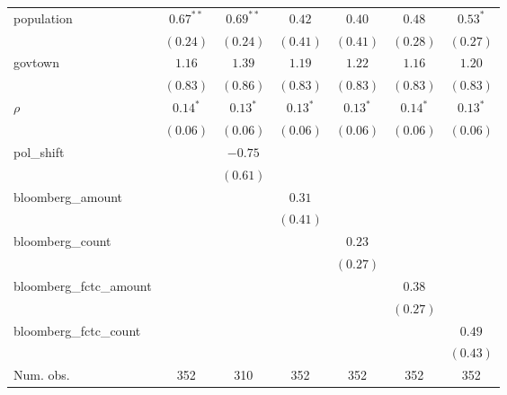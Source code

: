 \begin{table}[!h]
\begin{center}
\begin{tabular}{l c c c c c c }
population              & $0.67^{**}$  & $0.69^{**}$  & $0.42$       & $0.40$       & $0.48$       & $0.53^{*}$   \\
                        & $(0.24)$     & $(0.24)$     & $(0.41)$     & $(0.41)$     & $(0.28)$     & $(0.27)$     \\
govtown                 & $1.16$       & $1.39$       & $1.19$       & $1.22$       & $1.16$       & $1.20$       \\
                        & $(0.83)$     & $(0.86)$     & $(0.83)$     & $(0.83)$     & $(0.83)$     & $(0.83)$     \\
$\rho$                  & $0.14^{*}$   & $0.13^{*}$   & $0.13^{*}$   & $0.13^{*}$   & $0.14^{*}$   & $0.13^{*}$   \\
                        & $(0.06)$     & $(0.06)$     & $(0.06)$     & $(0.06)$     & $(0.06)$     & $(0.06)$     \\
pol\_shift              &              & $-0.75$      &              &              &              &              \\
                        &              & $(0.61)$     &              &              &              &              \\
bloomberg\_amount       &              &              & $0.31$       &              &              &              \\
                        &              &              & $(0.41)$     &              &              &              \\
bloomberg\_count        &              &              &              & $0.23$       &              &              \\
                        &              &              &              & $(0.27)$     &              &              \\
bloomberg\_fctc\_amount &              &              &              &              & $0.38$       &              \\
                        &              &              &              &              & $(0.27)$     &              \\
bloomberg\_fctc\_count  &              &              &              &              &              & $0.49$       \\
                        &              &              &              &              &              & $(0.43)$     \\
\midrule
Num. obs.               & 352          & 310          & 352          & 352          & 352          & 352          \\

\end{tabular}
\end{center}
\end{table}
